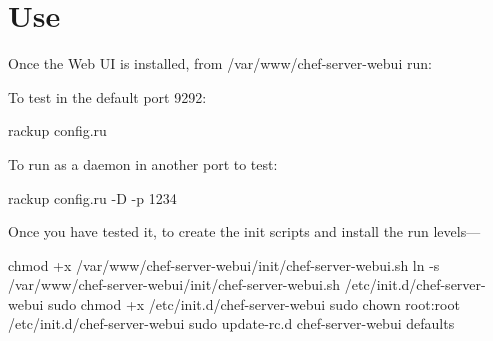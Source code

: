 \section{Use}

Once the Web UI is installed, from /var/www/chef-server-webui run:

To test in the default port 9292:
\begin{codelisting}
\label{code:}
\codecaption{}
\begin{code}
rackup config.ru
\end{code}
\end{codelisting}

To run as a daemon in another port to test:
\begin{codelisting}
\label{code:}
\codecaption{}
\begin{code}
rackup config.ru -D -p 1234
\end{code}
\end{codelisting}

Once you have tested it, to create the init scripts and install the run levels---
\begin{codelisting}
\label{code:}
\codecaption{}
\begin{code}
chmod +x /var/www/chef-server-webui/init/chef-server-webui.sh
ln -s /var/www/chef-server-webui/init/chef-server-webui.sh /etc/init.d/chef-server-webui
sudo chmod +x /etc/init.d/chef-server-webui
sudo chown root:root /etc/init.d/chef-server-webui
sudo update-rc.d chef-server-webui defaults
\end{code}
\end{codelisting}